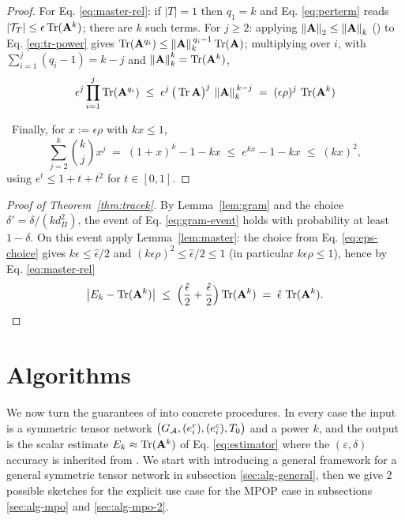 \documentclass[11pt]{article}
\theoremstyle{plain}
\theoremstyle{definition}
\theoremstyle{remark}
\begin{document}
\begin{proof}
For Eq. \eqref{eq:master-rel}: if $|T| = 1$ then $q_1 = k$ and Eq. \eqref{eq:perterm} reads $|\mathcal{T}_T| \le \epsilon \operatorname{Tr}(\mathbf{A}^k)$; there are $k$ such terms. 
For $j \ge 2$: applying $\left\| \mathbf{A} \right\|_{2}\le\left\| \mathbf{A} \right\|_{k}$
() to Eq. \eqref{eq:tr-power} gives
$\operatorname{Tr}(\mathbf{A}^{q_i}) \le \left\| \mathbf{A} \right\|_{k}^{\,q_i-1}\operatorname{Tr}(\mathbf{A})$;
multiplying over $i$, with $\sum_{i=1}^{j}(q_i-1)=k-j$ and
$\left\| \mathbf{A} \right\|_{k}^{k}=\operatorname{Tr}(\mathbf{A}^{k})$,
\begin{equation}
\epsilon^{j} \prod_{i=1}^{j} \operatorname{Tr}(\mathbf{A}^{q_i})
\;\le\; \epsilon^{j}\, \big(\operatorname{Tr}\mathbf{A}\big)^{j}\, \left\| \mathbf{A} \right\|_{k}^{\,k-j}
\;=\; (\epsilon\rho)^{j}\, \operatorname{Tr}(\mathbf{A}^k)
\end{equation}

\
Finally, for $x := \epsilon\rho$ with $kx \le 1$,
\begin{equation}
\sum_{j=2}^{k} \binom{k}{j} x^j \;=\; (1+x)^k - 1 - kx \;\le\; e^{kx} - 1 - kx \;\le\; (kx)^2 ,
\end{equation}
using $e^t \le 1 + t + t^2$ for $t \in [0,1]$.
\end{proof}

\begin{proof}[Proof of Theorem~\ref{thm:tracek}]
By Lemma~\ref{lem:gram} and the choice $\delta' = \delta/(k d_{\Pi}^2)$, the event of Eq. \eqref{eq:gram-event} holds with probability at least $1-\delta$. On this event apply Lemma~\ref{lem:master}: the choice from Eq. \eqref{eq:eps-choice} gives $k\epsilon \le \hat\epsilon/2$ and $(k\epsilon\rho)^2 \le \hat\epsilon/2 \le 1$ (in particular $k\epsilon\rho \le 1$), hence by Eq. \eqref{eq:master-rel}
\begin{equation}
\big| E_k - \operatorname{Tr}(\mathbf{A}^k) \big| \;\le\; \Big( \frac{\hat\epsilon}{2} + \frac{\hat\epsilon}{2} \Big) \operatorname{Tr}(\mathbf{A}^k) \;=\; \hat\epsilon\, \operatorname{Tr}(\mathbf{A}^k).
\end{equation}
\end{proof}

\section{Algorithms}
\label{sec:algorithms}
We now turn the guarantees of  into concrete procedures. In
every case the input is a symmetric tensor network
$\bigl(G_{\mathcal{A}},(e_i^{r}),(e_i^{c}),T_0\bigr)$ and a power $k$, and the
output is the scalar estimate $E_{k}\approx\mathop{\mathrm{Tr}}(\mathbf{A}^{k})$ of Eq.
\eqref{eq:estimator} where the $(\varepsilon,\delta)$ accuracy is inherited from
\Cref{thm:k1,thm:tracek}.
We start with introducing a general framework for a general symmetric tensor network in subsection \ref{sec:alg-general}, then we give 2 possible sketches for the explicit use case for the MPOP case in subsections \ref{sec:alg-mpo} and \ref{sec:alg-mpo-2}.
\end{document}
